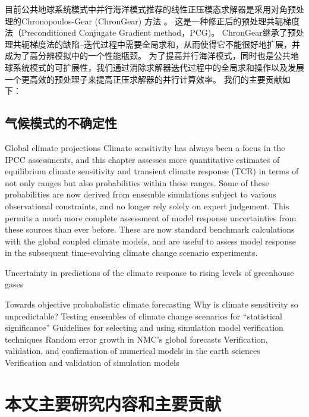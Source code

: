 目前公共地球系统模式中并行海洋模式推荐的线性正压模态求解器是采用对角预处理的Chronopoulos-Gear (ChronGear) 方法
\cite{dAzevedo1999lapack}。 这是一种修正后的预处理共轭梯度法（Preconditioned Conjugate
Gradient method，PCG)。 
ChronGear继承了预处理共轭梯度法的缺陷--迭代过程中需要全局求和，从而使得它不能很好地扩展，并成为了高分辨模拟中的一个性能瓶颈。
为了提高并行海洋模式，同时也是公共地球系统模式的可扩展性，我们通过消除求解器迭代过程中的全局求和操作以及发展一个更高效的预处理子来提高正压求解器的并行计算效率。
我们的主要贡献如下： 
 

\subsection{气候模式的不确定性}

 Global climate projections\cite{meehl2007global}
Climate sensitivity has always been a focus in the IPCC assessments, and this chapter assesses more quantitative estimates of equilibrium climate sensitivity and transient climate response (TCR) in terms of not only ranges but also probabilities within these ranges. Some of these probabilities are now derived from ensemble simulations subject to various observational constraints, and no longer rely solely on expert judgement. This permits a much more complete assessment of model response uncertainties from these sources than ever before. These are now standard benchmark calculations with the global coupled climate models, and are useful to assess model response in the subsequent time-evolving climate change scenario experiments.

\cite{stainforth2005uncertainty} Uncertainty in predictions of the climate response to rising levels of greenhouse gases

\cite{allen2002towards} Towards objective probabalistic climate forecasting
\cite{roe2007climate} Why is climate sensitivity so unpredictable?
\cite{von2013testing} Testing ensembles of climate change scenarios for “statistical significance”
\cite{whitner1989guidelines} Guidelines for selecting and using simulation model verification techniques
\cite{reynolds1994random}  Random error growth in NMC's global forecasts
\cite{oreskes1994verification} Verification, validation, and confirmation of numerical models in the earth sciences
\cite{sargent2005verification}  Verification and validation of simulation models

\section{本文主要研究内容和主要贡献}
